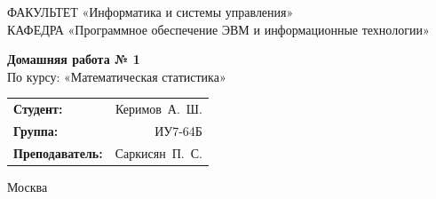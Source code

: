 \begin{titlepage}
{	{\doublespacing \small \raggedright ФАКУЛЬТЕТ \hspace{37mm} «Информатика и системы управления»\\
	КАФЕДРА \hspace{17mm} «Программное обеспечение ЭВМ и информационные технологии»\\}

	\vspace{50mm}

	\textbf{Домашняя работа № 1}\\
	По курсу: «Математическая статистика»\\

	\vspace{40mm}

	\begin{flushleft}
		\begin{tabular}{lr}
			\textbf{Студент:}        & Керимов~А.~Ш.  \\
			\textbf{Группа:}         & ИУ7-64Б        \\
			\textbf{Преподаватель:}  & Саркисян~П.~С. \\
		\end{tabular}
	\end{flushleft}

	\vfill

	Москва\\
	\the\year\\}
\end{titlepage}

\setcounter{page}{2}
